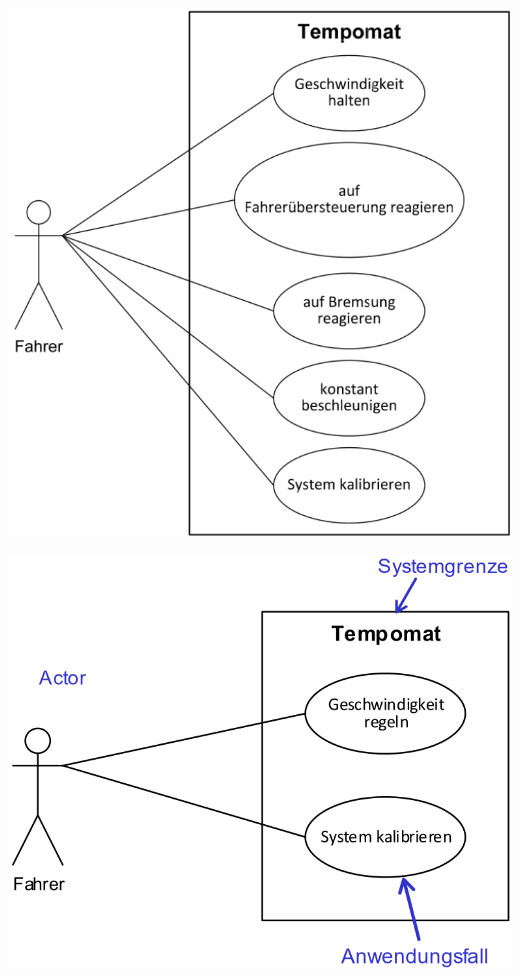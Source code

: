 \begin{minipage}[t]{0.4\columnwidth}

    \vspace{0.1cm}

    \includegraphics[width=\columnwidth]{images/use-case-diagramm_schlecht.png}
\end{minipage}
\hfill
\begin{minipage}[t]{0.48\columnwidth}

    \vspace{0.1cm}

    \includegraphics[width=\columnwidth]{images/use-case-diagramm_besser.png}
\end{minipage}


